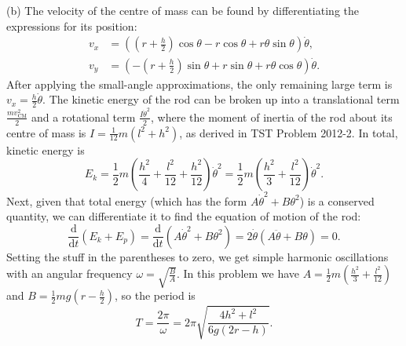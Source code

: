 \documentclass[../TST.tex]{subfiles}
\begin{document}
\begin{solution}
(b) The velocity of the centre of mass can be found by differentiating the expressions for its position:
\begin{align*}
	v_x&=\left( \left(r+\frac{h}{2}\right) \cos{\theta}-r\cos{\theta}+r\theta\sin{\theta}\right)\dot{\theta},\\
	v_y&=\left( -\left(r+\frac{h}{2}\right) \sin{\theta}+r\sin{\theta}+r\theta\cos{\theta}\right)\dot{\theta}.
\end{align*}
After applying the small-angle approximations, the only remaining large term is $v_x=\frac{h}{2}\dot{\theta}$. The kinetic energy of the rod can be broken up into a translational term $\frac{mv_\mathrm{CM}^2}{2}$ and a rotational term $\frac{I\dot{\theta}^2}{2}$, where the moment of inertia of the rod about its centre of mass is $I=\frac{1}{12}m(l^2+h^2)$, as derived in TST Problem 2012-2. In total, kinetic energy is 
\begin{equation*}
	E_k=\frac{1}{2}m \left(\frac{h^2}{4}+\frac{l^2}{12}+\frac{h^2}{12}\right)\dot{\theta}^2=\frac{1}{2}m \left(\frac{h^2}{3}+\frac{l^2}{12}\right)\dot{\theta}^2
.
\end{equation*}
Next, given that total energy (which has the form $A\dot{\theta}^2+B\theta^2$) is a conserved quantity, we can differentiate it to find the equation of motion of the rod:
\begin{equation*}
	\frac{\mathrm{d}}{\mathrm{d}t}\left(E_k+E_p\right)= \frac{\mathrm{d}}{\mathrm{d}t}\left(A\dot{\theta}^2+B\theta^2\right) = 2\dot{\theta}\left(A\ddot{\theta}+B\theta\right)=0
.
\end{equation*}
Setting the stuff in the parentheses to zero, we get simple harmonic oscillations with an angular frequency $\omega =\sqrt{\frac{B}{A}}$. In this problem we have $A=\frac{1}{2}m \left(\frac{h^2}{3}+\frac{l^2}{12}\right) $ and $B=\frac{1}{2}mg \left(r-\frac{h}{2}\right) $, so the period is
\begin{equation*}
	T=\frac{2\pi}{\omega}=\boxed{2\pi\sqrt{\frac{4h^2+l^2}{6g(2r-h)}}.}
\end{equation*}

\end{solution}
\fi
\end{document}
